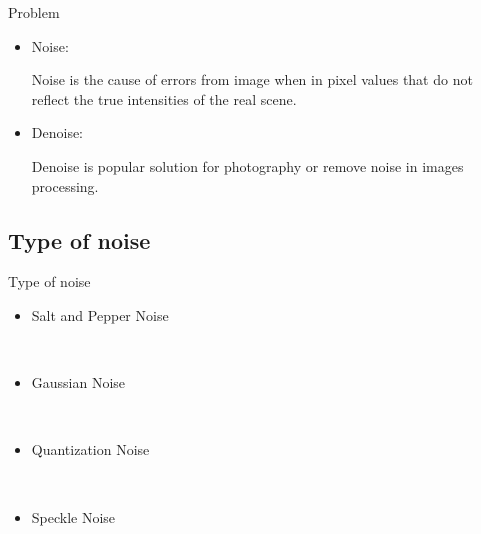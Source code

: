 \documentclass{beamer}
\begin{document}
\begin{frame}{Problem}



\begin{itemize}



\item Noise:

Noise is the cause of errors from image when in pixel values that do not reflect the true intensities of the real scene.

\vspace{7mm}

\item Denoise:

Denoise is popular solution for photography or remove noise in images processing.



\end{itemize}






\end{frame}

\subsection{Type of noise}

\begin{frame}{Type of noise}


\begin{itemize}
	\item Salt and Pepper Noise
	


	
	\
	
	\item  Gaussian Noise
	
	
	\
	
	\item Quantization Noise
	
    \
    
    \item Speckle Noise


\end{itemize}

\end{frame}
\end{document}
